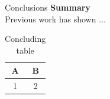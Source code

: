 \begin{block}{Conclusions}
  \textbf{Summary} \\
  Previous work has shown ...

  \begin{table}
    \centering
    \small
    \begin{tabular}{cc}
      \toprule
      A & B \\
      \midrule
      1 & 2 \\
      \bottomrule
    \end{tabular}
    \caption{Concluding table}
  \end{table}
\end{block}
